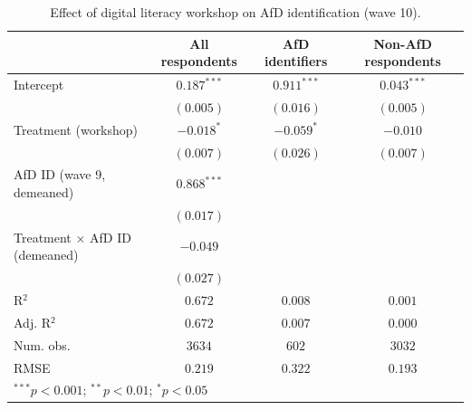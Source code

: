 
\begin{table}
\begin{center}
\begin{tabular}{l c c c}
\hline
 & All respondents & AfD identifiers & Non-AfD respondents \\
\hline
Intercept                     & $0.187^{***}$ & $0.911^{***}$ & $0.043^{***}$ \\
                              & $(0.005)$     & $(0.016)$     & $(0.005)$     \\
Treatment (workshop)          & $-0.018^{*}$  & $-0.059^{*}$  & $-0.010$      \\
                              & $(0.007)$     & $(0.026)$     & $(0.007)$     \\
AfD ID (wave 9, demeaned)     & $0.868^{***}$ &               &               \\
                              & $(0.017)$     &               &               \\
Treatment × AfD ID (demeaned) & $-0.049$      &               &               \\
                              & $(0.027)$     &               &               \\
\hline
R$^2$                         & $0.672$       & $0.008$       & $0.001$       \\
Adj. R$^2$                    & $0.672$       & $0.007$       & $0.000$       \\
Num. obs.                     & $3634$        & $602$         & $3032$        \\
RMSE                          & $0.219$       & $0.322$       & $0.193$       \\
\hline
\multicolumn{4}{l}{\scriptsize{$^{***}p<0.001$; $^{**}p<0.01$; $^{*}p<0.05$}}
\end{tabular}
\caption{Effect of digital literacy workshop on AfD identification (wave 10).}
\label{tab:afd_maintained_support}
\end{center}
\end{table}
